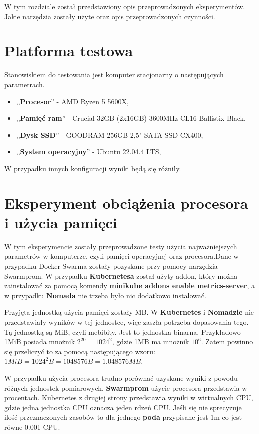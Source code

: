\documentclass{iiuwb}
\begin{document}
W tym rozdziale został przedstawiony opis przeprowadzonych eksperymentów. Jakie narzędzia zostały użyte oraz opis przeprowadzonych czynności. 

\section{Platforma testowa}

Stanowiskiem do testowania jest komputer stacjonarny o następujących parametrach.

\begin{itemize}
    \item ,,\textbf{Procesor}'' - AMD Ryzen 5 5600X, 
    \item ,,\textbf{Pamięć ram}'' -  Crucial 32GB (2x16GB) 3600MHz CL16 Ballistix Black,
    \item ,,\textbf{Dysk SSD}'' -  GOODRAM 256GB 2,5" SATA SSD CX400,
    \item ,,\textbf{System operacyjny}'' - Ubuntu 22.04.4 LTS,
\end{itemize}

W przypadku innych konfiguracji wyniki będą się różniły.

\section{Eksperyment obciążenia procesora i użycia pamięci}

W tym eksperymencie zostały przeprowadzone testy użycia 
najważniejszych parametrów w komputerze, czyli pamięci 
operacyjnej oraz procesora.Dane w przypadku Docker Swarma zostały 
pozyskane przy pomocy narzędzia Swarmprom. W przypadku 
\textbf{Kubernetesa} został użyty addon, który można zainstalować 
za pomocą komendy \textbf{minikube addons enable metrics-server}, 
a w przypadku \textbf{Nomada} nie trzeba było nic dodatkowo instalować.

Przyjęta jednostką użycia pamięci zostały MB. W 
\textbf{Kubernetes} i \textbf{Nomadzie} nie przedstawiały wyników 
w tej jednostce, więc zaszła potrzeba dopasowania tego. Tą jednostką 
są MiB, czyli mebibity. Jest to jednostka binarna. Przykładowo 1MiB 
posiada mnożnik $2^20 = 1024^2$, gdzie 1MB ma mnożnik $10^6$. 
Zatem powinno się przeliczyć to za pomocą następującego wzoru: 
$1 MiB = 1024^2 B = 1048576 B = 1.048576 MB$. 

W przypadku użycia procesora trudno porównać uzyskane wyniki z powodu 
różnych jednostek pomiarowych. \textbf{Swarmprom} użycie procesora 
przedstawia w procentach. Kubernetes z drugiej strony przedstawia 
wyniki w wirtualnych CPU, gdzie jedna jednostka CPU oznacza jeden 
rdzeń CPU. Jeśli się nie sprecyzuje ilość przeznaczonych zasobów to 
dla jednego \textbf{poda} przypisane jest 1m co jest równe 0.001 CPU.
\end{document}
